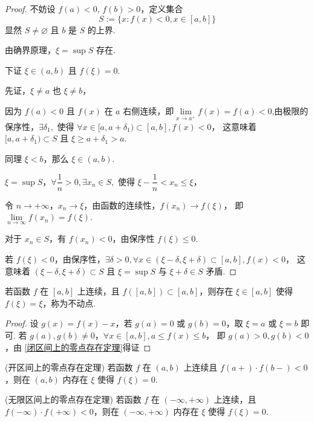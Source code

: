 \begin{proof}
	不妨设 \( f(a) < 0 \), \( f(b) > 0 \)，定义集合
	\[ S := \{ x : f(x) < 0, x \in [a, b] \} \]
	显然 \( S \neq \varnothing \) 且 \( b \) 是 \( S \) 的上界.
	
	由确界原理，\(\xi = \sup S\) 存在.
	
	下证 \(\xi \in (a, b)\) 且 \(f(\xi) = 0\).
	
	先证，\(\xi \neq a\) 也 \(\xi \neq b\)，
	
	因为 \(f(a) < 0\) 且 \(f(x)\) 在 \(a\) 右侧连续，即$\lim\limits_{x\to a^+}f(x)=f(a)<0$,由极限的保序性，\(\exists \delta_1, \) 使得 \(\forall x \in [a, a + \delta_1) \subset [a, b], f(x) < 0\)，
	这意味着 \([a, a + \delta_1) \subset S\) 且 \(\xi \geqslant a + \delta_1 > a\).
	
	同理 \(\xi < b\)，那么 \(\xi \in (a,b)\).
	
	\(\xi = \sup S\)，\(\forall \dfrac{1}{n} > 0, \exists x_n \in S, \) 使得 \(\xi - \dfrac{1}{n} < x_n \leqslant \xi\)，
	
	令 \(n \to +\infty\)，\(x_n \to \xi\)，由函数的连续性，\(f(x_n) \to f(\xi)\)，
	即 \(\lim\limits_{n \to \infty} f(x_n) = f(\xi)\).
	
	对于 \(x_n \in S\)，有 \(f(x_n) < 0\)，由保序性 \(f(\xi) \leqslant 0\).
	
	若 \(f(\xi) < 0\)，由保序性，\(\exists \delta > 0, \forall x \in (\xi - \delta, \xi + \delta) \subset [a, b], f(x) < 0\)，
	这意味着 \((\xi - \delta, \xi + \delta) \subset S\) 且 \(\xi = \sup S\) 与 \(\xi + \delta \in S\) 矛盾.
	
\end{proof}
\begin{corollary}
	若函数 \( f \) 在 \([a, b]\) 上连续，且 \( f([a, b]) \subset [a, b] \)，则存在 \(\xi \in [a, b]\) 使得 \( f(\xi) = \xi \)，称为不动点.
	
\end{corollary}
\begin{proof}
	设 \( g(x) = f(x) - x \)，若 \( g(a) = 0 \) 或 \( g(b) = 0 \)，取 \(\xi = a\) 或 \(\xi = b\) 即可.
	若 \( g(a), g(b) \neq 0 \)，\(\forall x \in [a, b], a \leqslant f(x) \leqslant b\)，
	即 \( g(a) > 0, g(b) < 0 \)，由 \ref{闭区间上的零点存在定理}得证
\end{proof}
\begin{corollary}(开区间上的零点存在定理)
	若函数 \( f \) 在 \((a, b)\) 上连续且 \( f(a+) \cdot f(b-) < 0 \)，则在 \((a, b)\) 内存在 \(\xi\) 使得 \( f(\xi) = 0 \).
\end{corollary}
\begin{corollary}(无限区间上的零点存在定理)
	若函数 \( f \) 在 \((-\infty, +\infty)\) 上连续，且 \( f(-\infty) \cdot f(+\infty) < 0 \)，则在 \((-\infty, +\infty)\) 内存在 \(\xi\) 使得 \( f(\xi) = 0 \).
\end{corollary}
